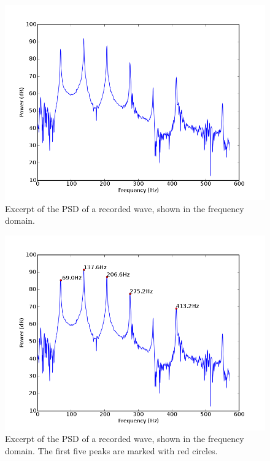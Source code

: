 \documentclass[twocolumn]{article}
\begin{document}
\begin{figure}
\centering
\includegraphics[width=\linewidth]{figures/recording-psd.png}
\caption{Excerpt of the PSD of a recorded wave, shown in the frequency domain.}
\label{psd}
\end{figure}

\begin{figure}
\centering
\includegraphics[width=\linewidth]{figures/recording-peaks.png}
\caption{Excerpt of the PSD of a recorded wave, shown in the frequency domain. The first five peaks are marked with red circles.}
\label{peaks}
\end{figure}
\end{document}
